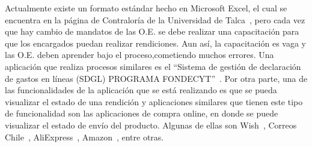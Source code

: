 
Actualmente existe un formato estándar hecho en Microsoft Excel, el cual se encuentra en la página de Contraloría de la Universidad de Talca~\cite{6}, pero cada vez que hay cambio de mandatos de las O.E. se debe realizar una capacitación para que los encargados puedan realizar rendiciones. Aun así, la capacitación es vaga y las O.E. deben aprender bajo el proceso,cometiendo muchos errores.
Una aplicación que realiza procesos similares es el ``Sistema de gestión de declaración de gastos en líneas (SDGL) PROGRAMA FONDECYT''~\cite{9}.
Por otra parte, una de las funcionalidades de la aplicación que se está realizando es que se pueda visualizar el estado de una rendición y aplicaciones similares que tienen este tipo de funcionalidad son las aplicaciones de compra online, en donde se puede visualizar el estado de envío del producto. Algunas de ellas son Wish~\cite{10}, Correos Chile~\cite{11}, AliExpress~\cite{12}, Amazon~\cite{13}, entre otras.

